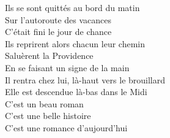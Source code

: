 \documentclass{novel}
\begin{document}
\begin{multicols}{2}
Ils se sont quittés au bord du matin\\
Sur l'autoroute des vacances\\
C'était fini le jour de chance\\
Ils reprirent alors chacun leur chemin\\
Saluèrent la Providence\\
En se faisant un signe de la main\\

Il rentra chez lui, là-haut vers le brouillard\\
Elle est descendue là-bas dans le Midi\\
C'est un beau roman\\
C'est une belle histoire\\
C'est une romance d'aujourd'hui

\end{multicols}
\end{document}
